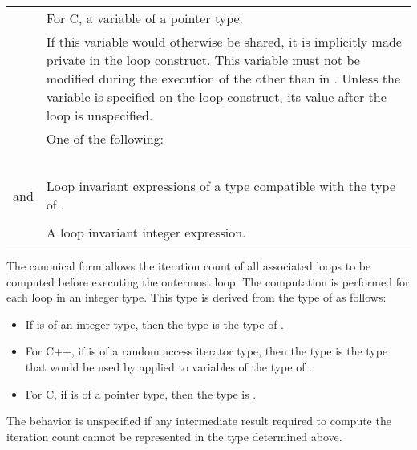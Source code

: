 \begin{supertabular}{ p{0.8in} p{4.5in}}
 & \hspace{1.5em}For C, a variable of a pointer type.\\
 & If this variable would otherwise be shared, it is implicitly made private in the loop 
  construct. This variable must not be modified during the execution of the  
  other than in . Unless the variable is specified  on the
  loop construct, its value after the loop is unspecified.\\
 & One of the following:\\
 & \code{<}\\
 & \code{<=}\\
 & \code{>}\\
 & \code{>=}\\
 & \\
 and  & Loop invariant expressions of a type compatible with the type of .\\
 & \\
 & A loop invariant integer expression.\\
\end{supertabular}
\linenumbers
\medskip

\begin{figure}[t!]
\end{figure}
The canonical form allows the iteration count of all associated loops to be computed 
before executing the outermost loop. The computation is performed for each loop in an 
integer type. This type is derived from the type of  as follows:

\begin{itemize}
\item If  is of an integer type, then the type is the type of .

\item For C++, if  is of a random access iterator type, then the type is the type that 
would be used by  applied to variables of the type of .

\item For C, if  is of a pointer type, then the type is .
\end{itemize}

The behavior is unspecified if any intermediate result required to compute the iteration 
count cannot be represented in the type determined above.

